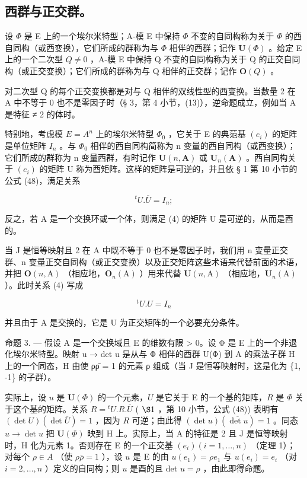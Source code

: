 \subsection{西群与正交群。}

设 \(\Phi\) 是 E 上的一个埃尔米特型；A-模 E 中保持 \(\Phi\) 不变的自同构称为关于 \(\Phi\) 的西自同构（或西变换），它们所成的群称为与 \(\Phi\) 相伴的西群；记作 \(\mathbf{U}(\Phi)\) 。给定 E 上的一个二次型 \(Q \neq 0\) ，A-模 E 中保持 Q 不变的自同构称为关于 Q 的正交自同构（或正交变换）；它们所成的群称为与 Q 相伴的正交群；记作 \(\mathbf{O}(Q)\) 。

对二次型 Q 的每个正交变换都是对与 Q 相伴的双线性型的西变换。当数量 2 在 A 中不等于 0 也不是零因子时（§ 3，第 4 小节，(13)），逆命题成立，例如当 A 是特征 ≠ 2 的体时。

特别地，考虑模 \(E = A^{n}\) 上的埃尔米特型 \(\Phi_{0}\) ，它关于 E 的典范基 \((e_{i})\) 的矩阵是单位矩阵 \(I_{n}\) 。与 \(\Phi_{0}\) 相伴的西自同构简称为 n 变量的西自同构（或西变换）；它们所成的群称为 n 变量西群，有时记作 \(\mathbf{U}(n, \mathbf{A})\) 或 \(\mathbf{U}_{n}(\mathbf{A})\) 。西自同构关于 \((e_{i})\) 的矩阵 U 称为酉矩阵。这样的矩阵是可逆的，并且依 § 1 第 10 小节的公式 (48)，满足关系

\[
{ } ^ { t } U . \overline { { U } } = I _ { n } ;\tag{4}
\]

反之，若 A 是一个交换环或一个体，则满足 (4) 的矩阵 U 是可逆的，从而是酉的。

当 J 是恒等映射且 2 在 A 中既不等于 0 也不是零因子时，我们用 n 变量正交群、n 变量正交自同构（或正交变换）以及正交矩阵这些术语来代替前面的术语，并把 \(\mathbf{O}(n,\mathrm{A})\) （相应地，\(\mathbf{O}_n(\mathrm{A})\) ）用来代替 \(\mathbf{U}(n,\mathrm{A})\) （相应地，\(\mathbf{U}_n(\mathrm{A})\) ）。此时关系 (4) 写成

\[
{ } ^ { t } U . U = I _ { n }\tag{5}
\]

并且由于 A 是交换的，它是 U 为正交矩阵的一个必要充分条件。

命题 3. --- 假设 A 是一个交换域且 E 的维数有限 \textgreater{} 0。设 Φ 是 E 上的一个非退化埃尔米特型。映射 u → det u 是从与 Φ 相伴的酉群 U(Φ) 到 A 的乘法子群 H 上的一个同态，H 由使 ρρ̄ = 1 的元素 ρ 组成（当 J 是恒等映射时，这是化为 \{1, -1\} 的子群）。

实际上，设 \(u\) 是 \(\mathbf{U}(\Phi)\) 的一个元素，\(U\) 是它关于 E 的一个基的矩阵，\(R\) 是 \(\Phi\) 关于这个基的矩阵。关系 \(R = {}^t U.R.\overline{U}\) ( \(\S 1\) ，第 10 小节，公式 (48)) 表明有 \((\det U)(\det \overline{U}) = 1\) ，因为 \(R\) 可逆；由此得 \((\det u)(\overline{\det u}) = 1\) 。同态 \(u \to \det u\) 把 \(\mathbf{U}(\Phi)\) 映到 H 上。实际上，当 A 的特征是 2 且 J 是恒等映射时，H 化为元素 1。否则存在 E 的一个正交基 \((e_i)(i = 1,\ldots,n)\) （定理 1）；对每个 \(\rho \in A\) （使 \(\rho \bar{\rho} = 1\) ），设 \(u\) 是 E 的由 \(u(e_1) = \rho e_1\) 与 \(u(e_i) = e_i\) （对 \(i = 2,\ldots,n\) ）定义的自同构；则 \(u\) 是酉的且 det \(u = \rho\) ，由此即得命题。


